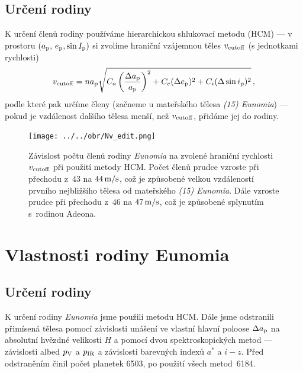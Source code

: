 \documentclass[a4paper, 12pt]{article}
\begin{document}
\subsection{Určení rodiny}
K určení členů rodiny používáme hierarchickou shlukovací metodu (HCM) --- v prostoru $(a_{\rm p},\,e_{\rm p},\sin I_{\rm p})$ si zvolíme hraniční vzájemnou  těles $v_{\rm cutoff}$ (s jednotkami rychlosti)
\begin{align*}
	v_{\rm cutoff}=na_{\rm p}\sqrt{C_a\left(\frac{\Delta a_{\rm p}}{a_{\rm p}}\right)^2+C_e(\Delta e_{\rm p})^2+C_i(\Delta \sin i_{\rm p})^2}\,,
\end{align*}
podle které pak určíme členy (začneme u mateřského tělesa \textit{(15) Eunomia}) --- pokud je vzdálenost dalšího tělesa menší, než $v_{\rm cutoff}$, přidáme jej do rodiny.

\begin{figure}
	\centering
	\texttt{[image: ../../obr/Nv\_edit.png]}
	\caption{Závislost počtu členů rodiny \textit{Eunomia} na zvolené hraniční rychlosti $v_{\rm cutoff}$ při použití metody HCM. Počet členů prudce vzroste při přechodu z~$43$ na $44\,{\rm m/s}$, což je způsobené velkou vzdáleností prvního nejbližšího tělesa od mateřského \textit{(15) Eunomia}. Dále vzroste prudce při přechodu z~$46$ na $47\,{\rm m/s}$, což je způsobené splynutím s~rodinou Adeona.}
\end{figure}
\clearpage

\newpage
\section{Vlastnosti rodiny Eunomia}

\subsection{Určení rodiny}
K určení rodiny \textit{Eunomia} jsme použili metodu HCM. Dále jsme odstranili přimísená tělesa pomocí závislosti unášení ve vlastní hlavní poloose $\Delta a_{\rm p}$ na absolutní hvězdné velikosti $H$ a pomocí dvou spektroskopických metod --- závislosti albed $p_{\rm V}$ a $p_{\rm IR}$ a závislosti barevných indexů $a^*$ a $i-z$. Před odstraněním činil počet planetek 6503, po použití všech metod~6184.
\end{document}
